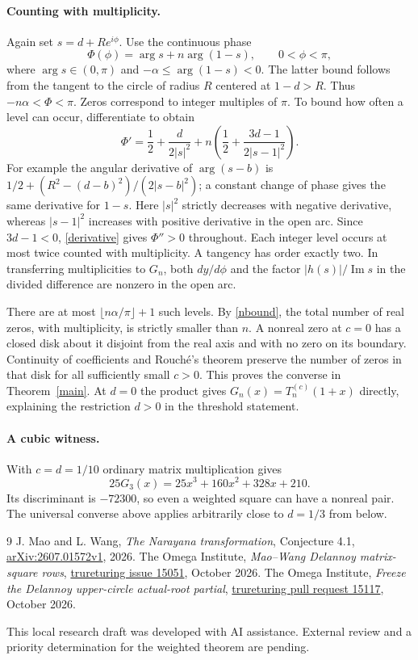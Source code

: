 \documentclass[11pt]{article}
\begin{document}
\paragraph{Counting with multiplicity.} Again set $s=d+Re^{i\phi}$. Use the continuous phase
\[
 \Phi(\phi)=\arg s+n\arg(1-s),\qquad 0<\phi<\pi,
\]
where $\arg s\in(0,\pi)$ and $-\alpha\le\arg(1-s)<0$. The latter bound follows from the tangent to the circle of radius $R$ centered at $1-d>R$. Thus $-n\alpha<\Phi<\pi$. Zeros correspond to integer multiples of $\pi$. To bound how often a level can occur, differentiate to obtain
\begin{equation}\label{derivative}
 \Phi'=\frac12+\frac{d}{2|s|^2}
       +n\left(\frac12+\frac{3d-1}{2|s-1|^2}\right).
\end{equation}
For example the angular derivative of $\arg(s-b)$ is $1/2+(R^2-(d-b)^2)/(2|s-b|^2)$; a constant change of phase gives the same derivative for $1-s$. Here $|s|^2$ strictly decreases with negative derivative, whereas $|s-1|^2$ increases with positive derivative in the open arc. Since $3d-1<0$, \eqref{derivative} gives $\Phi''>0$ throughout. Each integer level occurs at most twice counted with multiplicity. A tangency has order exactly two. In transferring multiplicities to $G_n$, both $dy/d\phi$ and the factor $|h(s)|/\operatorname{Im}s$ in the divided difference are nonzero in the open arc.

There are at most $\lfloor n\alpha/\pi\rfloor+1$ such levels. By \eqref{nbound}, the total number of real zeros, with multiplicity, is strictly smaller than $n$. A nonreal zero at $c=0$ has a closed disk about it disjoint from the real axis and with no zero on its boundary. Continuity of coefficients and Rouch\'e's theorem preserve the number of zeros in that disk for all sufficiently small $c>0$. This proves the converse in Theorem~\ref{main}. At $d=0$ the product gives $G_n(x)=T_n^{(c)}(1+x)$ directly, explaining the restriction $d>0$ in the threshold statement.

\paragraph{A cubic witness.} With $c=d=1/10$ ordinary matrix multiplication gives
\[
 25G_3(x)=25x^3+160x^2+328x+210.
\]
Its discriminant is $-72300$, so even a weighted square can have a nonreal pair. The universal converse above applies arbitrarily close to $d=1/3$ from below.

\begin{thebibliography}{9}\small
{} J. Mao and L. Wang, \emph{The Narayana transformation}, Conjecture 4.1, \href{https://arxiv.org/abs/2607.01572}{arXiv:2607.01572v1}, 2026.
 The Omega Institute, \emph{Mao--Wang Delannoy matrix-square rows}, \href{https://github.com/the-omega-institute/trureturing/issues/15051}{trureturing issue 15051}, October 2026.
 The Omega Institute, \emph{Freeze the Delannoy upper-circle actual-root partial}, \href{https://github.com/the-omega-institute/trureturing/pull/15117}{trureturing pull request 15117}, October 2026.
\end{thebibliography}
\noindent\small This local research draft was developed with AI assistance. External review and a priority determination for the weighted theorem are pending.
\end{document}
